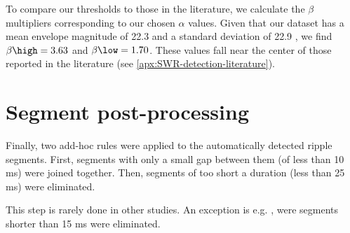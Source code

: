 To compare our thresholds to those in the literature, we calculate the $\beta$ multipliers corresponding to our chosen $\alpha$ values. Given that our dataset has a mean envelope magnitude of 22.3 \uV{} and a standard deviation of 22.9 \uV{}, we find $\beta\high = 3.63$ and $\beta\low = 1.70$. These values fall near the center of those reported in the literature (see \cref{apx:SWR-detection-literature}).



\section{Segment post-processing}

Finally, two add-hoc rules were applied to the automatically detected ripple segments. First, segments with only a small gap between them (of less than 10 ms) were joined together. Then, segments of too short a duration (less than 25 ms) were eliminated.

This step is rarely done in other studies. An exception is e.g. \cite{Dutta2018}, were segments shorter than 15 ms were eliminated.



